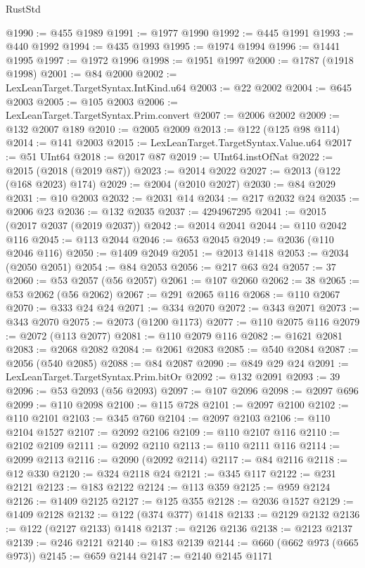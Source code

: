 \begin{lexlean}{RustStd}
\begin{coremodule}
@1990 := @455 @1989
@1991 := @1977 @1990
@1992 := @445 @1991
@1993 := @440 @1992
@1994 := @435 @1993
@1995 := @1974 @1994
@1996 := @1441 @1995
@1997 := @1972 @1996
@1998 := @1951 @1997
@2000 := @1787 (@1918 @1998)
@2001 := @84 @2000
@2002 := LexLeanTarget.TargetSyntax.IntKind.u64
@2003 := @22 @2002
@2004 := @645 @2003
@2005 := @105 @2003
@2006 := LexLeanTarget.TargetSyntax.Prim.convert
@2007 := @2006 @2002
@2009 := @132 @2007 @189
@2010 := @2005 @2009
@2013 := @122 (@125 @98 @114)
@2014 := @141 @2003
@2015 := LexLeanTarget.TargetSyntax.Value.u64
@2017 := @51 UInt64
@2018 := @2017 @87
@2019 := UInt64.instOfNat
@2022 := @2015 (@2018 (@2019 @87))
@2023 := @2014 @2022
@2027 := @2013 (@122 (@168 @2023) @174)
@2029 := @2004 (@2010 @2027)
@2030 := @84 @2029
@2031 := @10 @2003
@2032 := @2031 @14
@2034 := @217 @2032 @24
@2035 := @2006 @23
@2036 := @132 @2035
@2037 := 4294967295
@2041 := @2015 (@2017 @2037 (@2019 @2037))
@2042 := @2014 @2041
@2044 := @110 @2042 @116
@2045 := @113 @2044
@2046 := @653 @2045
@2049 := @2036 (@110 @2046 @116)
@2050 := @1409 @2049
@2051 := @2013 @1418
@2053 := @2034 (@2050 @2051)
@2054 := @84 @2053
@2056 := @217 @63 @24
@2057 := 37
@2060 := @53 @2057 (@56 @2057)
@2061 := @107 @2060
@2062 := 38
@2065 := @53 @2062 (@56 @2062)
@2067 := @291 @2065 @116
@2068 := @110 @2067
@2070 := @333 @24 @24
@2071 := @334 @2070
@2072 := @343 @2071
@2073 := @343 @2070
@2075 := @2073 (@1200 @1173)
@2077 := @110 @2075 @116
@2079 := @2072 (@113 @2077)
@2081 := @110 @2079 @116
@2082 := @1621 @2081
@2083 := @2068 @2082
@2084 := @2061 @2083
@2085 := @540 @2084
@2087 := @2056 (@540 @2085)
@2088 := @84 @2087
@2090 := @849 @29 @24
@2091 := LexLeanTarget.TargetSyntax.Prim.bitOr
@2092 := @132 @2091
@2093 := 39
@2096 := @53 @2093 (@56 @2093)
@2097 := @107 @2096
@2098 := @2097 @696
@2099 := @110 @2098
@2100 := @115 @728
@2101 := @2097 @2100
@2102 := @110 @2101
@2103 := @345 @760
@2104 := @2097 @2103
@2106 := @110 @2104 @1527
@2107 := @2092 @2106
@2109 := @110 @2107 @116
@2110 := @2102 @2109
@2111 := @2092 @2110
@2113 := @110 @2111 @116
@2114 := @2099 @2113
@2116 := @2090 (@2092 @2114)
@2117 := @84 @2116
@2118 := @12 @330
@2120 := @324 @2118 @24
@2121 := @345 @117
@2122 := @231 @2121
@2123 := @183 @2122
@2124 := @113 @359
@2125 := @959 @2124
@2126 := @1409 @2125
@2127 := @125 @355
@2128 := @2036 @1527
@2129 := @1409 @2128
@2132 := @122 (@374 @377) @1418
@2133 := @2129 @2132
@2136 := @122 (@2127 @2133) @1418
@2137 := @2126 @2136
@2138 := @2123 @2137
@2139 := @246 @2121
@2140 := @183 @2139
@2144 := @660 (@662 @973 (@665 @973))
@2145 := @659 @2144
@2147 := @2140 @2145 @1171

\end{coremodule}
\end{lexlean}
